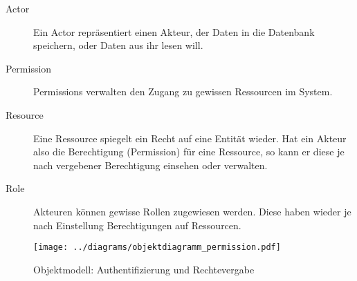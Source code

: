 \documentclass[11pt,german]{scrartcl}
\begin{document}
\begin{description}
\item [Actor]
Ein Actor repräsentiert einen Akteur, der Daten in die Datenbank speichern, oder Daten aus ihr lesen will.

\item [Permission]
Permissions verwalten den Zugang zu gewissen Ressourcen im System.

\item [Resource]
Eine Ressource spiegelt ein Recht auf eine Entität wieder. Hat ein Akteur also die Berechtigung (Permission) für eine Ressource, so kann er diese je nach vergebener Berechtigung einsehen oder verwalten.

\item [Role]
Akteuren können gewisse Rollen zugewiesen werden. Diese haben wieder je nach Einstellung Berechtigungen auf Ressourcen.
\end{description}

\begin{figure}[htb]
\begin{center}
\leavevmode
\texttt{[image: ../diagrams/objektdiagramm\_permission.pdf]}
\end{center}
\caption{Objektmodell: Authentifizierung und Rechtevergabe}
\label{fig:permission}
\end{figure}
\end{document}
